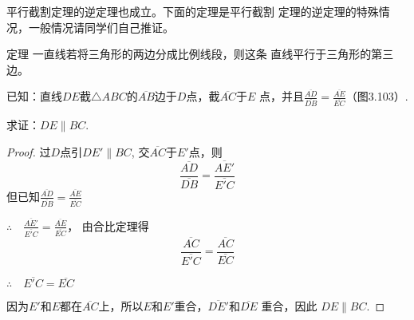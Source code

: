 平行截割定理的逆定理也成立。下面的定理是平行截割
定理的逆定理的特殊情况，一般情况请同学们自己推证。

\begin{blk}
    {定理} 一直线若将三角形的两边分成比例线段，则这条
直线平行于三角形的第三边。
\end{blk}

\begin{example}
    已知：直线$DE$截$\triangle ABC$的$\overline{AB}$边于$D$点，截$\overline{AC}$于$E$
点，并且$\frac{\overline{AD}}{\overline{DB}}=\frac{\overline{AE}}{\overline{EC}}$（图3.103）.

求证：$DE\parallel BC$.
\end{example}


\begin{proof}
过$D$点引$DE'\parallel BC$, 交$\overline{AC}$于$E'$点，则
\[\frac{\overline{AD}}{\overline{DB}}=\frac{\overline{AE'}}{\overline{E'C}}\]
但已知$\frac{\overline{AD}}{\overline{DB}}=\frac{\overline{AE}}{\overline{EC}}$

$\therefore\quad \frac{\overline{AE'}}{\overline{E'C}}=\frac{\overline{AE}}{\overline{EC}}$，
由合比定理得
\[\frac{\overline{AC}}{\overline{E'C}}=\frac{\overline{AC}}{\overline{EC}}\]

$\therefore\quad \overline{E'C}=\overline{EC}$

因为$E'$和$E$都在$\overline{AC}$上，所以$E$和$E'$重合，$\overline{DE'}$和$\overline{DE}$
重合，因此
$DE\parallel BC$.
\end{proof}

